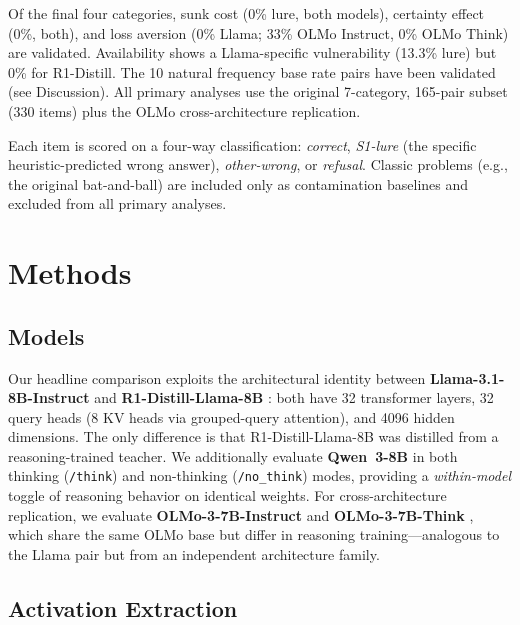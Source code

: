 \documentclass[accepted]{article}
\begin{document}
\noindent Of the final four categories, sunk cost (0\% lure, both
models), certainty effect (0\%, both), and loss aversion (0\% Llama;
33\% OLMo Instruct, 0\% OLMo Think) are validated.  Availability shows
a Llama-specific vulnerability (13.3\% lure) but 0\% for R1-Distill.
The 10 natural frequency base rate pairs have been validated (see
Discussion).  All primary analyses use the original 7-category,
165-pair subset (330 items) plus the OLMo cross-architecture
replication.

\noindent Each item is scored on a four-way classification: \emph{correct},
\emph{S1-lure} (the specific heuristic-predicted wrong answer),
\emph{other-wrong}, or \emph{refusal}.  Classic problems (e.g., the
original bat-and-ball) are included only as contamination baselines and
excluded from all primary analyses.


\section{Methods}
\label{sec:methods}

\subsection{Models}

Our headline comparison exploits the architectural identity between
\textbf{Llama-3.1-8B-Instruct} \citep{llama31} and
\textbf{R1-Distill-Llama-8B} \citep{deepseekr1}: both have 32
transformer layers, 32 query heads (8 KV heads via grouped-query
attention), and 4096 hidden dimensions.  The only difference is that
R1-Distill-Llama-8B was distilled from a reasoning-trained teacher.  We
additionally evaluate \textbf{Qwen~3-8B} in both thinking (\texttt{/think})
and non-thinking (\texttt{/no\_think}) modes, providing a
\emph{within-model} toggle of reasoning behavior on identical weights.
For cross-architecture replication, we evaluate
\textbf{OLMo-3-7B-Instruct} and \textbf{OLMo-3-7B-Think}
\citep{olmo3}, which share the same OLMo base but differ in reasoning
training---analogous to the Llama pair but from an independent
architecture family.

\subsection{Activation Extraction}
\end{document}
